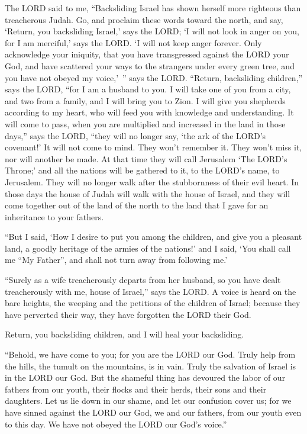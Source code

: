 \myverse{}The LORD said to me, “Backsliding Israel has shown herself more righteous than treacherous Judah. \myverse{}Go, and proclaim these words toward the north, and say, ‘Return, you backsliding Israel,’ says the LORD; ‘I will not look in anger on you, for I am merciful,’ says the LORD. ‘I will not keep anger forever. \myverse{}Only acknowledge your iniquity, that you have transgressed against the LORD your God, and have scattered your ways to the strangers under every green tree, and you have not obeyed my voice,’ ” says the LORD. \myverse{}“Return, backsliding children,” says the LORD, “for I am a husband to you. I will take one of you from a city, and two from a family, and I will bring you to Zion. \myverse{}I will give you shepherds according to my heart, who will feed you with knowledge and understanding. \myverse{}It will come to pass, when you are multiplied and increased in the land in those days,” says the LORD, “they will no longer say, ‘the ark of the LORD’s covenant!’ It will not come to mind. They won’t remember it. They won’t miss it, nor will another be made. \myverse{}At that time they will call Jerusalem ‘The LORD’s Throne;’ and all the nations will be gathered to it, to the LORD’s name, to Jerusalem. They will no longer walk after the stubbornness of their evil heart. \myverse{}In those days the house of Judah will walk with the house of Israel, and they will come together out of the land of the north to the land that I gave for an inheritance to your fathers.


\myverse{}“But I said, ‘How I desire to put you among the children, and give you a pleasant land, a goodly heritage of the armies of the nations!’ and I said, ‘You shall call me “My Father”, and shall not turn away from following me.’


\myverse{}“Surely as a wife treacherously departs from her husband, so you have dealt treacherously with me, house of Israel,” says the LORD. \myverse{}A voice is heard on the bare heights, the weeping and the petitions of the children of Israel; because they have perverted their way, they have forgotten the LORD their God.

\myverse{}Return, you backsliding children, and I will heal your backsliding.

“Behold, we have come to you; for you are the LORD our God. \myverse{}Truly help from the hills, the tumult on the mountains, is in vain. Truly the salvation of Israel is in the LORD our God. \myverse{}But the shameful thing has devoured the labor of our fathers from our youth, their flocks and their herds, their sons and their daughters. \myverse{}Let us lie down in our shame, and let our confusion cover us; for we have sinned against the LORD our God, we and our fathers, from our youth even to this day. We have not obeyed the LORD our God’s voice.”


